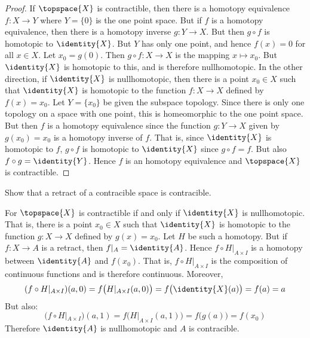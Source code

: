 \documentclass{book}                                                           %
\begin{document}
\begin{proof}
    If $\topspace{X}$ is contractible, then there is a homotopy
    equivalence $f:X\rightarrow{Y}$ where $Y=\{0\}$ is the
    one point space. But if $f$ is a homotopy equivalence, then
    there is a homotopy inverse $g:Y\rightarrow{X}$. But then
    $g\circ{f}$ is homotopic to $\identity{X}$. But $Y$ has only
    one point, and hence $f(x)=0$ for all $x\in{X}$. Let
    $x_{0}=g(0)$. Then $g\circ{f}:X\rightarrow{X}$ is the
    mapping $x\mapsto{x}_{0}$. But $\identity{X}$ is homotopic
    to this, and is therefore nullhomotopic. In the other
    direction, if $\identity{X}$ is nullhomotopic, then there is
    a point $x_{0}\in{X}$ such that $\identity{X}$ is homotopic
    to the function $f:X\rightarrow{X}$ defined by $f(x)=x_{0}$.
    Let $Y=\{x_{0}\}$ be given the subspace topology. Since
    there is only one topology on a space with one point, this
    is homeomorphic to the one point space. But then $f$ is a
    homotopy equivalence since the function $g:Y\rightarrow{X}$
    given by $g(x_{0})=x_{0}$ is a homotopy inverse of $f$. That
    is, since $\identity{X}$ is homotopic to $f$,
    $g\circ{f}$ is homotopic to $\identity{X}$ since
    $g\circ{f}=f$. But also $f\circ{g}=\identity{Y}$. Hence $f$
    is an homotopy equivalence and $\topspace{X}$ is
    contractible.
\end{proof}
\begin{problem}
    Show that a retract of a contracible space is contracible.
\end{problem}
\begin{solution}
    For $\topspace{X}$ is contractible if and only if
    $\identity{X}$ is nullhomotopic. That is, there is a point
    $x_{0}\in{X}$ such that $\identity{X}$ is homotopic to the
    function $g:X\rightarrow{X}$ defined by $g(x)=x_{0}$. Let $H$ be such a
    homotopy. But if $f:X\rightarrow{A}$ is a retract, then
    $f|_{A}=\identity{A}$. Hence $f\circ{H}|_{A\times{I}}$ is a
    homotopy between $\identity{A}$ and $f(x_{0})$. That is,
    $f\circ{H}|_{A\times{I}}$ is the composition of continuous functions and
    is therefore continuous. Moreover,
    \begin{subequations}
        \begin{align}
            (f\circ{H}|_{A\times{I}})(a,0)=f\big(H|_{A\times{I}}(a,0)\big)
                =f\big(\identity{X}(a)\big)
                =f(a)
                =a
        \end{align}
    \end{subequations}
    But also:
    \begin{equation}
        (f\circ{H}|_{A\times{I}})(a,1)=f\big(H|_{A\times{I}}(a,1)\big)
            =f\big(g(a)\big)
            =f(x_{0})
    \end{equation}
    Therefore $\identity{A}$ is nullhomotopic and $A$ is contracible.
\end{solution}
\end{document}
